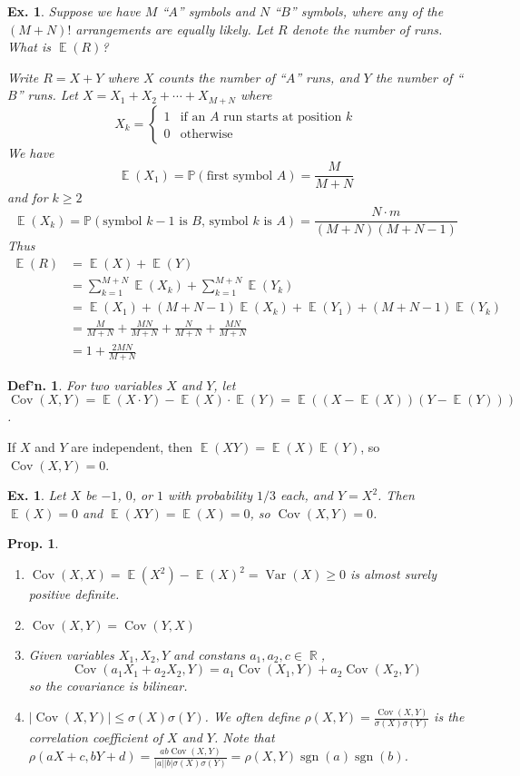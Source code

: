 \documentclass[12pt, a4paper]{book}
\DeclareMathOperator{\R}{\mathbb{R}}
\DeclareMathOperator{\E}{\mathbb{E}}
\DeclareMathOperator{\Var}{Var}
\DeclareMathOperator{\Cov}{Cov}
\DeclareMathOperator{\sgn}{sgn}
\renewcommand{\Pr}{\mathbb{P}}
\newtheorem{definition}[theorem]{Def'n.}
\newtheorem{proposition}[theorem]{Prop.}
\newtheorem{example}[theorem]{Ex.}
\theoremstyle{nonumberplain}
\begin{document}
\begin{example}
    Suppose we have $M$ ``$A$'' symbols and $N$ ``$B$'' symbols, where any of the $(M+N)!$ arrangements are equally likely.
    Let $R$ denote the number of runs.
    What is $\E(R)$?

    Write $R=X+Y$ where $X$ counts the number of ``$A$'' runs, and $Y$ the number of ``$B$'' runs.
    Let $X=X_1+X_2+\cdots+X_{M+N}$ where
    \[X_k=
        \begin{cases}
            1 &\text{if an $A$ run starts at position $k$}\\
            0 &\text{otherwise}
        \end{cases}
    \]
    We have
    \[\E(X_1)=\Pr(\text{first symbol $A$})=\frac{M}{M+N}\]
    and for $k\geq 2$
    \[\E(X_k)=\Pr(\text{symbol $k-1$ is $B$, symbol $k$ is $A$})=\frac{N\cdot m}{(M+N)(M+N-1)}\]
    Thus
    \begin{align*}
        \E(R) &= \E(X)+\E(Y)\\
              &= \sum\limits_{k=1}^{M+N}\E(X_k)+ \sum\limits_{k=1}^{M+N}\E(Y_k)\\
              &= \E(X_1)+(M+N-1)\E(X_k) + \E(Y_1)+(M+N-1)\E(Y_k)\\
              &= \frac{M}{M+N}+\frac{MN}{M+N}+\frac{N}{M+N}+\frac{MN}{M+N}\\
              &= 1+\frac{2MN}{M+N}
    \end{align*}
\end{example}
\begin{definition}
    For two variables $X$ and $Y$, let $\operatorname{Cov}(X,Y)=\E(X\cdot Y)-\E(X)\cdot\E(Y)=\E((X-\E(X))(Y-\E(Y)))$.
\end{definition}
If $X$ and $Y$ are independent, then $\E(XY)=\E(X)\E(Y)$, so $\operatorname{Cov}(X,Y)=0$.
\begin{example}
    Let $X$ be $-1$, $0$, or $1$ with probability $1/3$ each, and $Y=X^2$.
    Then $\E(X)=0$ and $\E(XY)=\E(X)=0$, so $\operatorname{Cov}(X,Y)=0$.
\end{example}
\begin{proposition}
    \begin{enumerate}
        \item $\Cov(X,X)=\E(X^2)-\E(X)^2=\Var(X)\geq 0$ is almost surely positive definite.
        \item $\Cov(X,Y)=\Cov(Y,X)$
        \item Given variables $X_1,X_2,Y$ and constans $a_1,a_2,c\in\R$,
            \[\Cov(a_1X_1+a_2X_2,Y)=a_1\Cov(X_1,Y)+a_2\Cov(X_2,Y)\]
            so the covariance is bilinear.
        \item $|\Cov(X,Y)|\leq\sigma(X)\sigma(Y)$.
            We often define $\rho(X,Y)=\frac{\Cov(X,Y)}{\sigma(X)\sigma(Y)}$ is the correlation coefficient of $X$ and $Y$.
            Note that $\rho(aX+c,bY+d)=\frac{ab\Cov(X,Y)}{|a||b|\sigma(X)\sigma(Y)}=\rho(X,Y)\sgn(a)\sgn(b)$.
    \end{enumerate}
\end{proposition}
\end{document}
